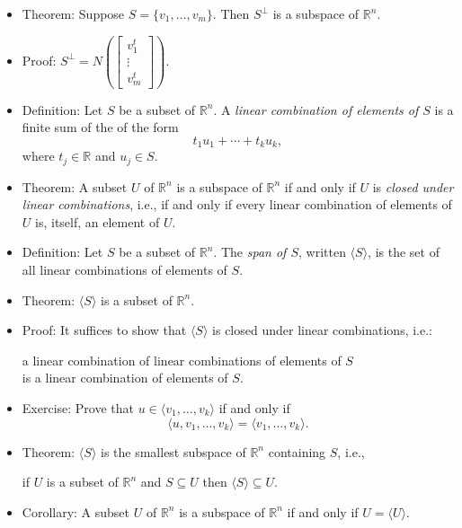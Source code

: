 \documentclass{amsart}
\newcommand{\RR}{\mathbb{R}}
\begin{document}
\begin{itemize}
\item Theorem: Suppose $S=\{v_1,\ldots,v_m\}$.
Then $S^\perp$ is a subspace of $\RR^n$.

\item Proof: $\displaystyle{S^\perp} = N\left(\begin{bmatrix}v_1^t\\\vdots\\v_m^t\end{bmatrix}\right)$.

\item Definition: Let $S$ be a subset of $\RR^n$.
A \emph{linear combination of elements of $S$} is a finite sum of the of the form
$$t_1u_1+\cdots +t_ku_k,$$
where $t_j\in \RR$ and $u_j\in S$.

\item Theorem: A subset $U$ of $\RR^n$ is a subspace of $\RR^n$ if and only if $U$ is \emph{closed under linear combinations}, i.e., if and only if every linear combination of elements of $U$ is, itself, an element of $U$.

\item Definition: Let $S$ be a subset of $\RR^n$. The \emph{span of $S$}, written $\langle S\rangle$, is the set of all linear combinations of elements of $S$.

\item Theorem: $\langle S\rangle$ is a subset of $\RR^n$.

\item Proof: It suffices to show that $\langle S\rangle$ is closed under linear combinations, i.e.:
\begin{center}
a linear combination of linear combinations of elements of $S$\\ is a linear combination of elements of $S$.
\end{center}

\item Exercise: Prove that $u\in \langle v_1,\ldots,v_k\rangle$ if and only if
$$\langle u, v_1,\ldots,v_k\rangle = \langle v_1,\ldots,v_k\rangle.$$
\item Theorem: $\langle S\rangle$ is the smallest subspace of $\RR^n$ containing $S$, i.e., 
\begin{center}
  if $U$ is a subset of $\RR^n$ and $S\subseteq U$ then $\langle S\rangle\subseteq U$.
\end{center}

\item Corollary: A subset $U$ of $\RR^n$ is a subspace of $\RR^n$ if and only if $U=\langle U\rangle$.


\end{itemize}
\end{document}
